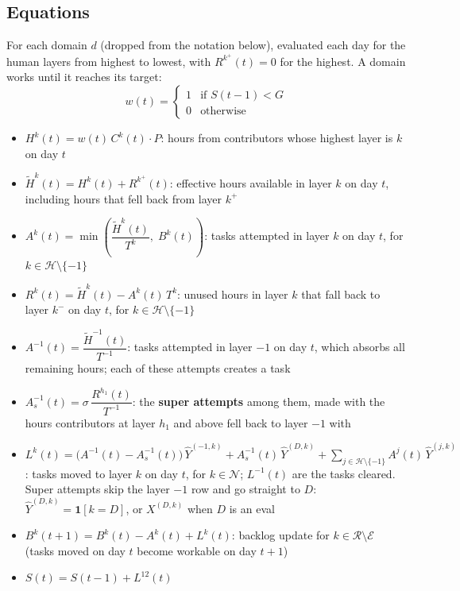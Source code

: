 \documentclass{article}
\begin{document}
\subsection*{Equations}
For each domain $d$ (dropped from the notation below), evaluated each day for the human layers from highest to lowest, with $R^{k^+}(t) = 0$ for the highest. A domain works until it reaches its target:
\[
  w(t) =
  \begin{cases}
    1 & \text{if } S(t-1) < G \\
    0 & \text{otherwise}
  \end{cases}
\]
\begin{itemize}
  \item $H^k(t) = w(t)\, C^k(t) \cdot P$: hours from contributors whose highest layer is $k$ on day $t$

  \item $\tilde{H}^k(t) = H^k(t) + R^{k^+}(t)$: effective hours available in layer $k$ on day $t$, including hours that fell back from layer $k^+$

  \item $A^k(t) = \min\left(\dfrac{\tilde{H}^k(t)}{T^k},\; B^k(t)\right)$: tasks attempted in layer $k$ on day $t$, for $k \in \mathcal{H} \setminus \{-1\}$

  \item $R^k(t) = \tilde{H}^k(t) - A^k(t)\, T^k$: unused hours in layer $k$ that fall back to layer $k^-$ on day $t$, for $k \in \mathcal{H} \setminus \{-1\}$

  \item $A^{-1}(t) = \dfrac{\tilde{H}^{-1}(t)}{T^{-1}}$: tasks attempted in layer $-1$ on day $t$, which absorbs all remaining hours; each of these attempts creates a task

  \item $A^{-1}_s(t) = \sigma\, \dfrac{R^{h_1}(t)}{T^{-1}}$: the \textbf{super attempts} among them, made with the hours contributors at layer $h_1$ and above fell back to layer $-1$ with

  \item $L^k(t) = \bigl(A^{-1}(t) - A^{-1}_s(t)\bigr)\, \hat{Y}^{(-1,k)} + A^{-1}_s(t)\, \hat{Y}^{(D,k)} + \displaystyle\sum_{j \in \mathcal{H} \setminus \{-1\}} A^j(t)\, \hat{Y}^{(j,k)}$: tasks moved to layer $k$ on day $t$, for $k \in \mathcal{N}$; $L^{-1}(t)$ are the tasks cleared. Super attempts skip the layer $-1$ row and go straight to $D$: $\hat{Y}^{(D,k)} = \mathbf{1}[k = D]$, or $X^{(D,k)}$ when $D$ is an eval

  \item $B^k(t+1) = B^k(t) - A^k(t) + L^k(t)$: backlog update for $k \in \mathcal{R} \setminus \mathcal{E}$ \\
  (tasks moved on day $t$ become workable on day $t+1$)

  \item $S(t) = S(t-1) + L^{12}(t)$
\end{itemize}
\end{document}
